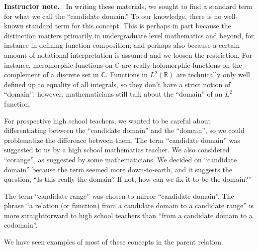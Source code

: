 \documentclass[11pt]{article}
\newenvironment{bignote}[1][Instructor note]%
	{\begin{mdframed}\raggedright{\bf #1.~}}
	{\end{mdframed}}
\theoremstyle{definition}
\begin{document}
\begin{bignote}
  In writing these materials, we sought to find a standard term for what we call the ``candidate domain.'' To our knowledge, there is no well-known standard term for this concept. This is perhaps in part because the distinction matters primarily in undergraduate level mathematics and beyond, for instance in defining function composition; and perhaps also because a certain amount of notational interpretation is assumed and we loosen the restriction. For instance, meromorphic functions on $\mathbb{C}$ are really holomorphic functions on the complement of a discrete set in $\mathbb{C}$. Functions in
$L^2(\mathbb{R})$ are technically only well defined up to equality of all integrals, so
they don't have a strict notion of  ``domain''; however, mathematicians still talk about the ``domain'' of an  $L^2$ function.

For prospective high school teachers, we wanted to be careful about differentiating between the ``candidate domain'' and the ``domain'', so we could problematize the difference between them. The term ``candidate domain'' was suggested to us by a high school mathematics teacher. We also considered ``corange'', as suggested by some mathematicians. We decided on ``candidate domain'' because the term seemed more down-to-earth, and it suggests the question, ``Is this really the domain? If not, how can we fix it to be the domain?''

The term ``candidate range'' was chosen to mirror ``candidate domain''. The phrase ``a relation (or function) from a candidate domain to a candidate range'' is more straightforward to high school teachers than ``from a candidate domain to a codomain''.  \end{bignote}

We have seen examples of most of these concepts in the parent relation. 
\end{document}
